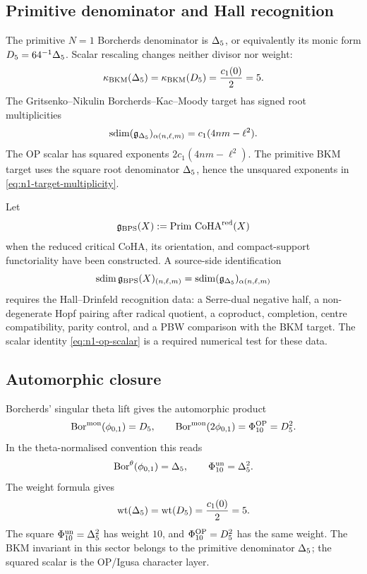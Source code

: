 \subsection*{Primitive denominator and Hall recognition}

The primitive \(N=1\) Borcherds denominator is \(\Delta_{5}\), or
equivalently its monic form \(D_{5}=64^{-1}\Delta_{5}\). Scalar
rescaling changes neither divisor nor weight:
\[
  \kappa_{\mathrm{BKM}}(\Delta_{5})=\kappa_{\mathrm{BKM}}(D_{5})=\frac{c_1(0)}{2}=5.
\]
The Gritsenko--Nikulin Borcherds--Kac--Moody target has signed root
multiplicities
\begin{equation}
\label{eq:n1-target-multiplicity}
  \operatorname{sdim}(\mathfrak{g}_{\Delta_{5}})_{\alpha(n,\ell,m)}
  =
  c_1(4nm-\ell^2).
\end{equation}
The OP scalar has squared exponents \(2c_1(4nm-\ell^2)\). The primitive
BKM target uses the square root denominator \(\Delta_{5}\), hence the
unsquared exponents in \eqref{eq:n1-target-multiplicity}.

Let
\[
  \mathfrak{g}_{\mathrm{BPS}}(X):=\operatorname{Prim}\,\mathrm{CoHA}^{\mathrm{red}}(X)
\]
when the reduced critical CoHA, its orientation, and compact-support
functoriality have been constructed. A source-side identification
\[
  \operatorname{sdim}\mathfrak{g}_{\mathrm{BPS}}(X)_{(n,\ell,m)}
  =
  \operatorname{sdim}(\mathfrak{g}_{\Delta_{5}})_{\alpha(n,\ell,m)}
\]
requires the Hall--Drinfeld recognition data: a Serre-dual negative
half, a non-degenerate Hopf pairing after radical quotient, a
coproduct, completion, centre compatibility, parity control, and a PBW
comparison with the BKM target. The scalar identity
\eqref{eq:n1-op-scalar} is a required numerical test for these data.

\subsection*{Automorphic closure}

Borcherds' singular theta lift gives the automorphic product
\[
  \operatorname{Bor}^{\mathrm{mon}}(\phi_{0,1})=D_{5},\qquad
  \operatorname{Bor}^{\mathrm{mon}}(2\phi_{0,1})=\Phi_{10}^{\mathrm{OP}}=D_{5}^2.
\]
In the theta-normalised convention this reads
\[
  \operatorname{Bor}^{\theta}(\phi_{0,1})=\Delta_{5},\qquad
  \Phi_{10}^{\mathrm{un}}=\Delta_{5}^2.
\]
The weight formula gives
\[
  \operatorname{wt}(\Delta_{5})
  =
  \operatorname{wt}(D_{5})
  =
  \frac{c_1(0)}{2}
  =
  5.
\]
The square \(\Phi_{10}^{\mathrm{un}}=\Delta_{5}^2\) has weight \(10\), and
\(\Phi_{10}^{\mathrm{OP}}=D_{5}^2\) has the same weight. The BKM invariant in this
sector belongs to the primitive denominator \(\Delta_{5}\); the squared
scalar is the OP/Igusa character layer.


